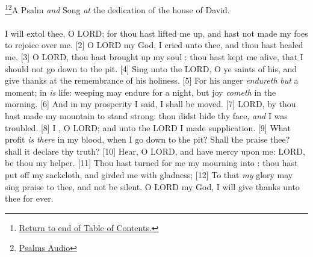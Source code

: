 \footnote{\textcolor[cmyk]{0.99998,1,0,0}{\hyperlink{TOC}{Return to end of Table of Contents.}}}\footnote{\href{https://www.audioverse.org/english/audiobibles/books/ENGKJV/O/Ps/1}{\textcolor[cmyk]{0.99998,1,0,0}{Psalms Audio}}}\textcolor[cmyk]{0.99998,1,0,0}{A Psalm \emph{and} Song \emph{at} the dedication of the house of David.}\\
\\
\textcolor[cmyk]{0.99998,1,0,0}{I will extol thee, O LORD; for thou hast lifted me up, and hast not made my foes to rejoice over me.}
[2] \textcolor[cmyk]{0.99998,1,0,0}{O LORD my God, I cried unto thee, and thou hast healed me.}
[3] \textcolor[cmyk]{0.99998,1,0,0}{O LORD, thou hast brought up my soul : thou hast kept me alive, that I should not go down to the pit.}
[4] \textcolor[cmyk]{0.99998,1,0,0}{Sing unto the LORD, O ye saints of his, and give thanks at the remembrance of his holiness.}
[5] \textcolor[cmyk]{0.99998,1,0,0}{For his anger \emph{endureth} \emph{but} a moment; in  \emph{is} life: weeping may endure for a night, but joy \emph{cometh} in the morning.}
[6] \textcolor[cmyk]{0.99998,1,0,0}{And in my prosperity I said, I shall  be moved.}
[7] \textcolor[cmyk]{0.99998,1,0,0}{LORD, by  thou hast made my mountain to stand strong: thou didst hide thy face, \emph{and} I was troubled.}
[8] \textcolor[cmyk]{0.99998,1,0,0}{I , O LORD; and unto the LORD I made supplication.}
[9] \textcolor[cmyk]{0.99998,1,0,0}{What profit \emph{is} \emph{there} in my blood, when I go down to the pit? Shall the  praise thee? shall it declare thy truth?}
[10] \textcolor[cmyk]{0.99998,1,0,0}{Hear, O LORD, and have mercy upon me: LORD, be thou my helper.}
[11] \textcolor[cmyk]{0.99998,1,0,0}{Thou hast turned for me my mourning into : thou hast put off my sackcloth, and girded me with gladness;}
[12] \textcolor[cmyk]{0.99998,1,0,0}{To  that \emph{my} glory may sing praise to thee, and not be silent. O LORD my God, I will give thanks unto thee for ever.}